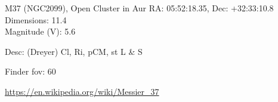 \begin{block}{M37 (NGC2099), Open Cluster in Aur}
    RA: 05:52:18.35, Dec: +32:33:10.8 \\ 
    Dimensions: 11.4 \\ 
    Magnitude (V): 5.6


    Desc: (Dreyer) Cl, Ri, pCM, st L \& S 

    Finder fov: 60 

    \url{https://en.wikipedia.org/wiki/Messier_37} 
\end{block}